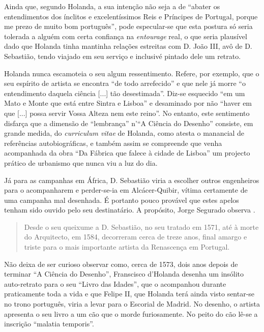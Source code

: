 \documentclass{article}
\begin{document}
Ainda que, segundo Holanda, a sua intenção não seja a de ``abater os
entendimentos dos ínclitos e excelentíssimos Reis e Príncipes de
Portugal, porque me prezo de muito bom português'', pode especular-se
que esta postura só seria tolerada a alguém com certa confiança na
\emph{entourage} real, o que seria plausível dado que Holanda tinha
mantinha relações estreitas com D. João III, avô de D. Sebastião,
tendo viajado em seu serviço e inclusivé pintado dele um retrato.

Holanda nunca escamoteia o seu algum ressentimento. Refere, por
exemplo, que o seu espírito de artista se encontra ``de todo
arrefecido'' e que nele já morre ``o entendimento daquela ciência
[...] tão desestimada''. Diz-se esquecido ``em um Mato e Monte que
está entre Sintra e Lisboa'' e desaminado por não ``haver em que [...]
possa servir Vossa Alteza nem este reino''. No entanto, este
sentimento disfarça que a dimensão de ``lembrança'' n'``A Ciência do
Desenho'' consiste, em grande medida, do \emph{curriculum vitae} de
Holanda, como atesta o manancial de referências autobiográficas, e
também assim se compreende que venha acompanhada da obra ``Da Fábrica
que falece à cidade de Lisboa'' um projecto prático de urbanismo que
nunca viu a luz do dia.

Já para as campanhas em África, D. Sebastião viria a escolher outros
engenheiros para o acompanharem \cite[notas,p.54]{holanda} e
perder-se-ia em Alcácer-Quibir, vítima certamente de uma campanha mal
desenhada. É portanto pouco provável que estes apelos tenham sido
ouvido pelo seu destinatário. A propósito, Jorge Segurado observa
\cite{segurado}.

\begin{quote}
  Desde o seu queixume a D. Sebastião, no seu tratado em 1571, até à
  morte do Arquitecto, em 1584, decorreram cerca de treze anos, final
  amargo e triste para o mais importante artista da Renascença em
  Portugal.
\end{quote}

Não deixa de ser curioso observar como, cerca de 1573, dois anos
depois de terminar ``A Ciência do Desenho'', Franscisco d'Holanda
desenha um insólito auto-retrato para o seu ``Livro das Idades'', que
o acompanhou durante praticamente toda a vida e que Felipe II, que
Holanda terá ainda visto sentar-se no trono português, viria a levar
para o Escorial de Madrid. No desenho, o artista apresenta o seu livro
a um cão que o morde furiosamente. No peito do cão lê-se a inscrição
``malatia temporis''.

\printbibliography[heading=bibliography,title={Bibliografia}]
\end{document}
